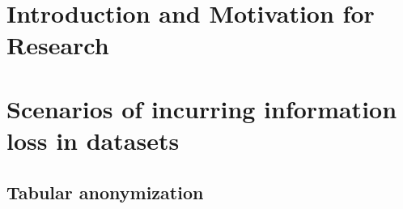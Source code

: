 \documentclass{llncs}
\begin{document}
\renewcommand{\thesubfigure}{\thefigure.\arabic{subfigure}}
\makeatletter
\renewcommand{\p@subfigure}{}
\renewcommand{\@thesubfigure}{\thesubfigure:\hskip\subfiglabelskip}
\makeatother


\section{Introduction and Motivation for Research}



\cite{Wimmer2014}

\cite{Majeed2017}



\section{Scenarios of incurring information loss in datasets}


\subsection{Tabular anonymization}
\label{ssect:tab_anonym}

\end{document}
